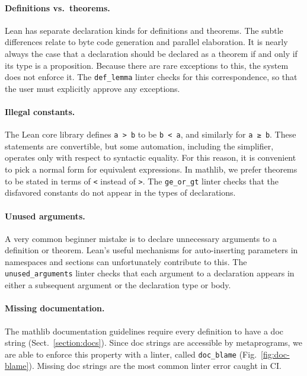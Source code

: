 \documentclass[runningheads]{llncs}
\newcommand{\mathlib}{\textsf{mathlib}\xspace}
\newcommand{\lean}[1]{\lstinline[language=lean]{#1}}
\begin{document}
\paragraph{Definitions vs.\ theorems.}
Lean has separate declaration kinds for definitions and theorems.
The subtle differences relate to byte code generation
and parallel elaboration.
It is nearly always the case that
a declaration should be declared as a theorem
if and only if its type is a proposition.
Because there are rare exceptions to this, the system does not enforce it.
The \lean{def_lemma} linter checks for this correspondence,
so that the user must explicitly approve any exceptions.

\paragraph{Illegal constants.}
The Lean core library defines \lean{a > b} to be \lean{b < a},
and similarly for \lean{a ≥ b}.
These statements are convertible,
but some automation, including the simplifier,
operates only with respect to syntactic equality.
For this reason, it is convenient to pick a normal form for equivalent expressions.
In \mathlib, we prefer theorems to be stated in terms of \lean{<} instead of \lean{>}.
The \lean{ge_or_gt} linter checks that the disfavored constants
do not appear in the types of declarations.

\paragraph{Unused arguments.}
A very common beginner mistake
is to declare unnecessary arguments to a definition or theorem.
Lean's useful mechanisms for auto-inserting parameters in namespaces and sections
can unfortunately contribute to this.
The \lean{unused_arguments} linter checks that each argument to a declaration
appears in either a subsequent argument or the declaration type or body.


\paragraph{Missing documentation.}
The \mathlib documentation guidelines require
every definition to have a doc string (Sect.~\ref{section:docs}).
Since doc strings are accessible by metaprograms,
we are able to enforce this property with a linter,
called \lean{doc_blame} (Fig.~\ref{fig:doc-blame}).
Missing doc strings are the most common linter error caught in CI.
\end{document}
